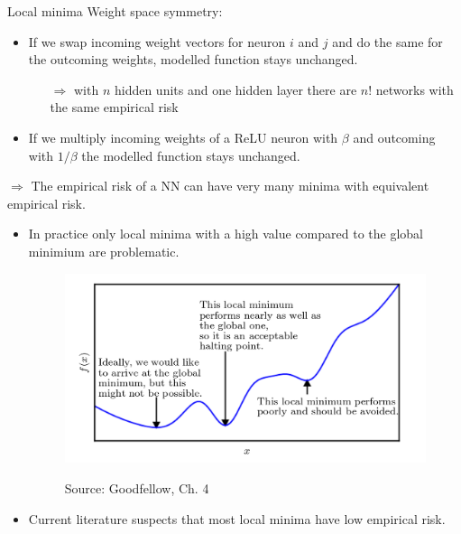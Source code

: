 \begin{vbframe} {Local minima}
   Weight space symmetry:
   \begin{itemize}
       \item If we swap incoming weight vectors for neuron $i$ and $j$
       and do the same for the outcoming weights,
       modelled function stays unchanged.
        \begin{itemize}
           \item[$\Rightarrow$] with $n$ hidden units and one hidden layer
           there are $n!$ networks with the same empirical risk
        \end{itemize}
       \item If we multiply incoming weights of a ReLU neuron with $\beta$
       and outcoming with $1/\beta$ the modelled function stays unchanged.
      \end{itemize}
  $\Rightarrow$ The empirical risk of a NN can have very many
          minima with equivalent empirical risk.

\framebreak 

    \begin{itemize}
     \item In practice only local minima with a high value compared to the global minimium are problematic.
    \begin{figure}
     \begin{center}
     \includegraphics[width=.6\textwidth]{figure/minima.png}
     \end{center}
    \tiny{Source: Goodfellow, Ch. 4}
    \end{figure}
     \item Current literature suspects that most local minima have low empirical risk.
\end{itemize}
\end{vbframe}

